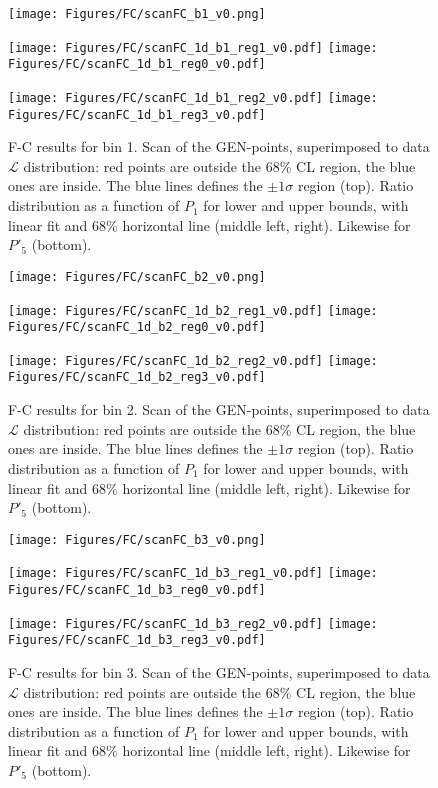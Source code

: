 \begin{figure}
  \centering
  \texttt{[image: Figures/FC/scanFC\_b1\_v0.png]}

  \texttt{[image: Figures/FC/scanFC\_1d\_b1\_reg1\_v0.pdf]}
  \texttt{[image: Figures/FC/scanFC\_1d\_b1\_reg0\_v0.pdf]}

  \texttt{[image: Figures/FC/scanFC\_1d\_b1\_reg2\_v0.pdf]}
  \texttt{[image: Figures/FC/scanFC\_1d\_b1\_reg3\_v0.pdf]}

  \caption{F-C results for bin 1.
    Scan of the GEN-points, superimposed to data $\mathcal{L}$ distribution: red points are outside the 68\% CL region, the blue ones are inside.
    The blue lines defines the $\pm1\sigma$ region (top).
    Ratio distribution as a function of $P_1$ for lower and upper bounds, with linear fit and 68\% horizontal line (middle left, right).
    Likewise for $P'_5$ (bottom).}
  \label{fig:FC1}
\end{figure}

\begin{figure}
  \centering
  \texttt{[image: Figures/FC/scanFC\_b2\_v0.png]}

  \texttt{[image: Figures/FC/scanFC\_1d\_b2\_reg1\_v0.pdf]}
  \texttt{[image: Figures/FC/scanFC\_1d\_b2\_reg0\_v0.pdf]}

  \texttt{[image: Figures/FC/scanFC\_1d\_b2\_reg2\_v0.pdf]}
  \texttt{[image: Figures/FC/scanFC\_1d\_b2\_reg3\_v0.pdf]}

  \caption{F-C results for bin 2.
    Scan of the GEN-points, superimposed to data $\mathcal{L}$ distribution: red points are outside the 68\% CL region, the blue ones are inside.
    The blue lines defines the $\pm1\sigma$ region (top).
    Ratio distribution as a function of $P_1$ for lower and upper bounds, with linear fit and 68\% horizontal line (middle left, right).
    Likewise for $P'_5$ (bottom).}
  \label{fig:FC2}
\end{figure}

\begin{figure}
  \centering
  \texttt{[image: Figures/FC/scanFC\_b3\_v0.png]}

  \texttt{[image: Figures/FC/scanFC\_1d\_b3\_reg1\_v0.pdf]}
  \texttt{[image: Figures/FC/scanFC\_1d\_b3\_reg0\_v0.pdf]}

  \texttt{[image: Figures/FC/scanFC\_1d\_b3\_reg2\_v0.pdf]}
  \texttt{[image: Figures/FC/scanFC\_1d\_b3\_reg3\_v0.pdf]}

  \caption{F-C results for bin 3.
    Scan of the GEN-points, superimposed to data $\mathcal{L}$ distribution: red points are outside the 68\% CL region, the blue ones are inside.
    The blue lines defines the $\pm1\sigma$ region (top).
    Ratio distribution as a function of $P_1$ for lower and upper bounds, with linear fit and 68\% horizontal line (middle left, right).
    Likewise for $P'_5$ (bottom).}
  \label{fig:FC3}
\end{figure}

